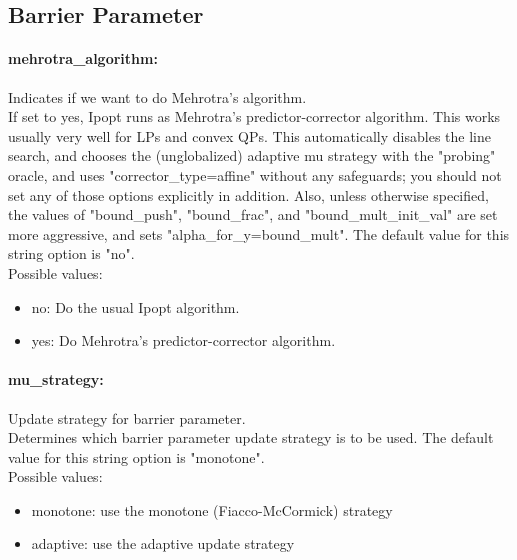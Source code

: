 \subsection{Barrier Parameter}

\paragraph{mehrotra\_algorithm:}\label{sec:mehrotra_algorithm} Indicates if we want to do Mehrotra's algorithm. $\;$ \\
 If set to yes, Ipopt runs as Mehrotra's
predictor-corrector algorithm. This works usually
very well for LPs and convex QPs.  This
automatically disables the line search, and
chooses the (unglobalized) adaptive mu strategy
with the "probing" oracle, and uses
"corrector\_type=affine" without any safeguards;
you should not set any of those options
explicitly in addition.  Also, unless otherwise
specified, the values of "bound\_push",
"bound\_frac", and "bound\_mult\_init\_val" are
set more aggressive, and sets
"alpha\_for\_y=bound\_mult".
The default value for this string option is "no".
\\ 
Possible values:
\begin{itemize}
   \item no: Do the usual Ipopt algorithm.
   \item yes: Do Mehrotra's predictor-corrector algorithm.
\end{itemize}

\paragraph{mu\_strategy:}\label{sec:mu_strategy} Update strategy for barrier parameter. $\;$ \\
 Determines which barrier parameter update
strategy is to be used.
The default value for this string option is "monotone".
\\ 
Possible values:
\begin{itemize}
   \item monotone: use the monotone (Fiacco-McCormick) strategy
   \item adaptive: use the adaptive update strategy
\end{itemize}

